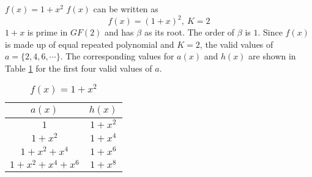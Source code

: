 \begin{example}
$f(x)=1+x^2$\newline
$f(x)$ can be written as $$f(x)=(1+x)^2,~K=2$$ $1+x$ is prime in $GF(2)$ and has $\beta$ as its root. The order of $\beta$ is $1$. Since $f(x)$ is made up of equal repeated polynomial and $K=2$, the valid values of $a=\{2,4,6,\cdots \}$.
The corresponding values for $a(x)$ and $h(x)$ are shown in Table \ref{novelTab1} for the first four valid values of $a$.
\begin{table}[htbp]
\renewcommand{\arraystretch}{1.3}
 \caption{$f(x)=1+x^2$}
 \centering
\begin{tabular}{c c } 
\hline
 $a(x)$ & $h(x)$ \\ [0.5ex] 
\hline\hline
$1$ & $1+x^2$\\ 
$1+x^2$ & $1+x^4$ \\
$1+x^2+x^4$ & $1+x^6$\\
$1+x^2+x^4+x^6$ & $1+x^8$ 
\end{tabular}
 \label{novelTab1}
\end{table}
\end{example}





